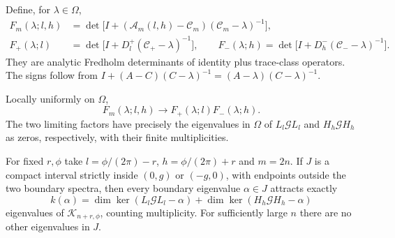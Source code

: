 Define, for $\lambda\in\Omega$,
\begin{align}
 F_m(\lambda;l,h)
   &=\det\bigl[I+(\mathscr A_m(l,h)-\mathscr C_m)
                             (\mathscr C_m-\lambda)^{-1}\bigr],\nonumber\\
 F_+(\lambda;l)
   &=\det\bigl[I+D_l^+(\mathscr C_+-\lambda)^{-1}\bigr],\qquad
 F_-(\lambda;h)
   =\det\bigl[I+D_h^-(\mathscr C_--\lambda)^{-1}\bigr].
 \label{v11:eq:gap-determinants}
\end{align}
They are analytic Fredholm determinants of identity plus trace-class
operators.  The signs follow from
$I+(A-C)(C-\lambda)^{-1}=(A-\lambda)(C-\lambda)^{-1}$.

\begin{theorem}\label{v11:thm:gap-limits}
Locally uniformly on $\Omega$,
\begin{equation}\label{v11:eq:gap-det-limit}
 F_m(\lambda;l,h)\longrightarrow F_+(\lambda;l)F_-(\lambda;h).
\end{equation}
The two limiting factors have precisely the eigenvalues in $\Omega$
of $L_l\mathcal G L_l$ and $H_h\mathcal G H_h$ as zeros, respectively,
with their finite multiplicities.

For fixed $r,\phi$ take $l=\phi/(2\pi)-r$, $h=\phi/(2\pi)+r$ and
$m=2n$.  If $J$ is a compact interval strictly inside $(0,g)$ or
$(-g,0)$, with endpoints outside the two boundary spectra, then every
boundary eigenvalue $\alpha\in J$ attracts exactly
\begin{equation}\label{v11:eq:gap-multiplicity}
 k(\alpha)=\dim\ker(L_l\mathcal G L_l-\alpha)
             +\dim\ker(H_h\mathcal G H_h-\alpha)
\end{equation}
eigenvalues of $\mathcal K_{n+r,\phi}$, counting multiplicity.
For sufficiently large $n$ there are no other eigenvalues in $J$.
\end{theorem}
